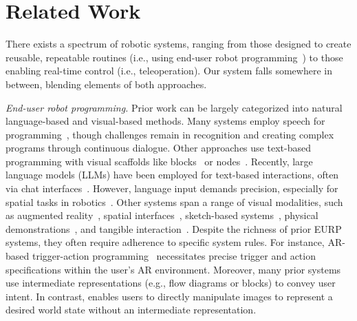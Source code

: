 \section{Related Work}
There exists a spectrum of robotic systems, ranging from those designed to create reusable, repeatable routines (i.e., using end-user robot programming~\cite{lieberman2006end, ajaykumar2021survey}) to those enabling real-time control (i.e., teleoperation). Our system falls somewhere in between, blending elements of both approaches.

\emph{End-user robot programming.} Prior work can be largely categorized into natural language-based and visual-based methods. Many systems employ speech for programming~\cite{cakmak2014teaching, gorostiza2011end}, though challenges remain in recognition and creating complex programs through continuous dialogue. Other approaches use text-based programming with visual scaffolds like blocks~\cite{huang2017code3, huang2016design, weintrop2018evaluating} or nodes~\cite{alexandrova2015roboflow,porfirio2018authoring}. Recently, large language models (LLMs) have been employed for text-based interactions, often via chat interfaces~\cite{karli2024alchemist, ge2024cocobo}. However, language input demands precision, especially for spatial tasks in robotics~\cite{masson2024directgpt, sundaresan2024rt}. Other systems span a range of visual modalities, such as augmented reality~\cite{ikeda2024programar, suzuki2022augmented, quintero2018robot, gong2019projection, cao2019ghostar}, spatial interfaces~\cite{huang2020vipo, cao2019v, mahadevan2022mimic}, sketch-based systems~\cite{sakamoto2009sketch, porfirio2023sketching}, physical demonstrations~\cite{akgun2012trajectories}, and tangible interaction~\cite{sefidgar2017situated, gao2019pati}. Despite the richness of prior EURP systems, they often require adherence to specific system rules. For instance, AR-based trigger-action programming~\cite{ikeda2024programar} necessitates precise trigger and action specifications within the user's AR environment. Moreover, many prior systems use intermediate representations (e.g., flow diagrams or blocks) to convey user intent. In contrast, \projname enables users to directly manipulate images to represent a desired world state without an intermediate representation.




